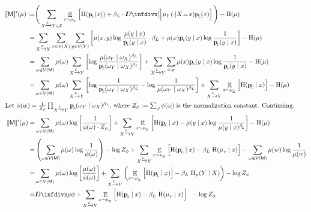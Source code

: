 \documentclass{article}
\newcommand{\bp}[1][L]{\mat{p}_{\!_#1\!}}
\newcommand{\V}{\mathcal V}
\newcommand{\Ed}{\mathcal E}
\newcommand{\sfM}{\mathsf M}
\newcommand{\alle}[1][L]{_{ X \xrightarrow{\!\!#1} Y }}
\newcommand{\ubrace}[3][blue]{\begingroup\color{#1} \vphantom{#2}\smash{\underbrace{\color{black}#2}_{#3}}\endgroup}
\begin{document}
	\begin{align*}
		\bbr{\sfM}'(\mu) :=& \Bigg(\sum_{ X \xrightarrow{\!\!L} Y  \in \Ed } \E_{x \sim \mu_{\!_X}}  \left[ \H (\bp (x)) + \beta_L \cdot \kldiv[\Big]{ \mu_Y(\cdot | X \!=\! x) }{\bp(x) }  \right] \Bigg) - \H(\mu) \\
		=& \sum_{ X \xrightarrow{\!\!L} Y } \sum_{x \in \V(X)} \sum_{y \in \V(Y)}  \left[
			\mu(x,y) \log \frac{\mu(y \mid x)}{\bp(y \mid x)}\cdot \beta_L 
			+ \mu(x) \bp(y \mid x) \log \frac{1}{\bp(y \mid x)} \right]  - \H(\mu) \\
%
%
		=& \sum_{\omega \in \V(\sfM)} \mu(\omega) \sum\alle \left[
			\log \frac{\mu(\omega_Y \mid \omega_X)^{\beta_L}}{\bp(\omega_Y \mid \omega_X)^{\beta_L}} 
			\right] + \sum\alle \sum_{x,y} \mu(x) \bp(y \mid x) \log \frac{1}{\bp(y \mid x)}   - \H(\mu) \\
%
		=& \sum_{\omega \in \V(\sfM)} \mu(\omega) \sum\alle \left[
			\log \frac{1}{\bp(\omega_Y \mid \omega_X)^{\beta_L} } - \log \frac{1}{\mu(\omega_Y \mid \omega_X)^{\beta_L}}
			\right] + \sum\alle \E_{x \sim \mu_{\!_X}} \Big[ \H(\bp \mid x) \Big] - \H(\mu) \\
%
	\intertext{Let $\phi(w) = \frac{1}{Z_{\phi}}\prod\alle \bp(\omega_Y \mid \omega_X)^{\beta_L}$, where $Z_\phi := \sum_{\omega} \phi(\omega)$ is the normalization constant. Continuing,}
%
		\bbr{\sfM}'(\mu) =& \sum_{\omega \in \V(\sfM)} \mu(\omega) \log \left[
			\frac{1}{\phi(\omega) \cdot Z_\phi} 
			\right] + \sum\alle \E_{x \sim \mu_{\!_X}} \left[ \H(\bp \mid x) - \mu(y \mid x) \log \frac{1}{\mu(y \mid x)^{\beta_{\!_L}\!}} \right]  - \H(\mu) \\
%
		=& \left(\sum_{\omega \in \V(\sfM)} \mu(\omega) \log \frac{1}{\phi(\omega) }\right) - \log Z_\phi + 
			\sum\alle \E_{x \sim \mu_{\!_X}} \Big[ \H(\bp \mid x) - \beta_L \ \H(\mu_{_Y}\! \mid x) \Big] -\sum_{\omega \in \V(\sfM)} \mu(w) \log \frac{1}{\mu(w)}  \\
%		
		=& \sum_{\omega \in \V(\sfM)} \mu(\omega) \log \left[
			\frac{\mu(\omega)}{\phi(\omega)  } 
			\right]  + \sum\alle \left( \E_{x \sim \mu_{\!_X}} \Big[ \H(\bp \mid x)\Big] - \beta_L \ \H_\mu(Y \mid X) \right) - \log Z_\phi \\
		=& \kldiv{\mu}{\phi} + \sum\alle \E_{x \sim \mu_{\!_X}} \Big[ \H(\bp \mid x) - \beta_L \ \H(\mu_{_Y}\! \mid x) \Big] ~~ - \log Z_\phi 
	\end{align*}
	
\end{document}
